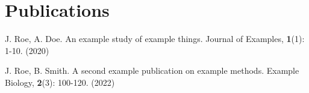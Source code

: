 \section{\sc Publications}

\begin{enumerate}
\bolditem J. Roe, A. Doe. An example study of example things. Journal of Examples, {\bf 1}(1): 1-10. (2020)

\bolditem J. Roe, B. Smith. A second example publication on example methods. Example Biology, {\bf 2}(3): 100-120. (2022)

\end{enumerate}

